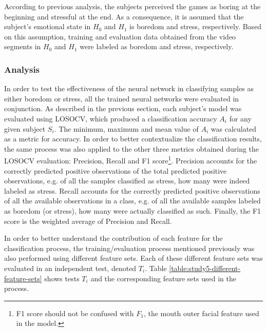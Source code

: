 According to previous analysis, the subjects perceived the games as boring at the beginning and stressful at the end. As a consequence, it is assumed that the subject's emotional state in $H_0$ and $H_1$ is boredom and stress, respectively. Based on this assumption, training and evaluation data obtained from the video segments in $H_0$ and $H_1$ were labeled as boredom and stress, respectively.



\subsubsection{Analysis}
\label{sec:experiment1-study5-analysis}

In order to test the effectiveness of the neural network in classifying samples as either boredom or stress, all the trained neural networks were evaluated in conjunction. As described in the previous section, each subject's model was evaluated using LOSOCV, which produced a classification accuracy $A_i$ for any given subject $S_i$. The minimum, maximum and mean value of $A_i$ was calculated as a metric for accuracy. In order to better contextualize the classification results, the same process was also applied to the other three metrics obtained during the LOSOCV evaluation: Precision, Recall and F1 score\footnote{F1 score should not be confused with $F_1$, the mouth outer facial feature used in the model.}. Precision accounts for the correctly predicted positive observations of the total predicted positive observations, e.g. of all the samples classified as stress, how many were indeed labeled as stress. Recall accounts for the correctly predicted positive observations of all the available observations in a class, e.g. of all the available samples labeled as boredom (or stress), how many were actually classified as such. Finally, the F1 score is the weighted average of Precision and Recall.

In order to better understand the contribution of each feature for the classification process, the training/evaluation process mentioned previously was also performed using different feature sets. Each of these different feature sets was evaluated in an independent test, denoted $T_i$. Table \ref{table:study5-different-feature-sets} shows tests $T_i$ and the corresponding feature sets used in the process.

